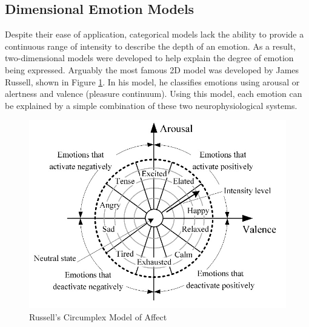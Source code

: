 \subsection{Dimensional Emotion Models}
    Despite their ease of application, categorical models lack the ability to provide a continuous range of intensity to describe the depth of an emotion. As a result, two-dimensional models were developed to help explain the degree of emotion being expressed. Arguably the most famous 2D model was developed by James Russell, shown in Figure \ref{fig:russell}. In his model, he classifies emotions using arousal or alertness and valence (pleasure continuum). Using this model, each emotion can be explained by a simple combination of these two neurophysiological systems.
    
    \begin{figure}[!htb]
    \centering
    \includegraphics[width=.5\textwidth]{figures/russell_emotions.png}
    \caption{\label{fig:russell} Russell's Circumplex Model of Affect \cite{russell-nodate}}
    \end{figure}
    